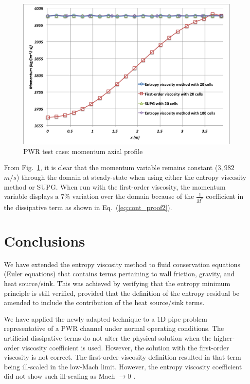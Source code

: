 \documentclass[12pt]{article}
\newcommand{\eqt}[1]{Eq.~(\ref{#1})} %
\newcommand{\fig}[1]{Fig.~\ref{#1}} %
\begin{document}
\begin{figure}[h]
\centering
\includegraphics[scale=0.4]{plots/Momentum.png}
\caption{PWR test case: momentum axial profile}
\label{fig:Momentum}
\end{figure}
From \fig{fig:Momentum}, it is clear that the momentum variable remains constant ($3,982$ $m/s$) through the domain at steady-state when using either the entropy viscosity method or SUPG. When run with the first-order viscosity, the momentum variable displays a $7\%$ variation over the domain because of the $\frac{1}{M^*}$ coefficient in the dissipative term as shown in \eqt{eq:cont_proof2}.
%
\section{Conclusions} 
\label{sect::ccl}

We have extended the entropy viscosity method to fluid conservation equations (Euler equations) that contains terms pertaining to wall friction, gravity, and heat source/sink. This was achieved by verifying that the entropy minimum principle is still verified, provided that the definition of the entropy residual be amended to include the contribution of the heat source/sink terms. 

We have applied the newly adapted technique to a 1D pipe problem representative of a PWR channel under normal operating conditions. The artificial dissipative terms do not alter the physical solution when the higher-order viscosity coefficient is used. However, the solution with the first-order viscosity is not correct.
The first-order viscosity definition resulted in that term being ill-scaled in the low-Mach limit. However, the entropy viscosity coefficient did not show such ill-scaling as Mach $\rightarrow 0$ .
\end{document}
